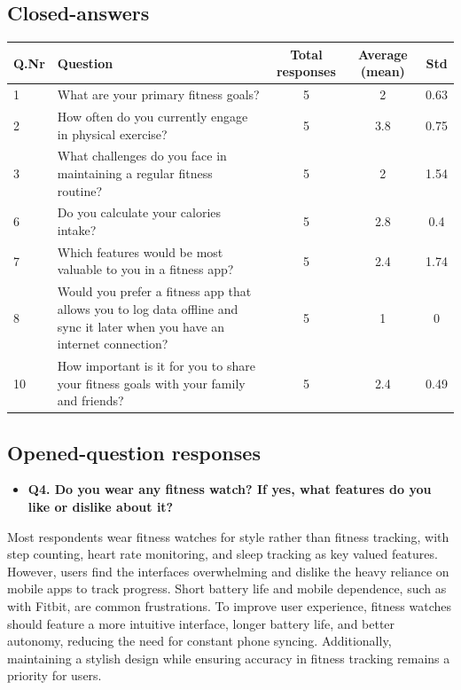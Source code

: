 \documentclass[letterpaper,11pt]{texMemo} %
\begin{document}
\subsection{Closed-answers}
\begin{center}
	\begin{tabular}{| l | p{4cm} | c | c | c |}
		\hline
		\bfseries{Q.Nr} & \bfseries{Question} & \bfseries{Total responses} & \bfseries{Average (mean)} & \bfseries{Std} \\ \hline
		1 & What are your primary fitness goals? & 5 & 2 & 0.63\\ \hline
		2 & How often do you currently engage in physical exercise? & 5 & 3.8 & 0.75 \\ \hline
		3 & What challenges do you face in maintaining a regular fitness routine? & 5 & 2 & 1.54 \\ \hline
		6 & Do you calculate your calories intake? & 5 & 2.8 & 0.4 \\ \hline
		7 & Which features would be most valuable to you in a fitness app? & 5 & 2.4 & 1.74 \\ \hline
		8 & Would you prefer a fitness app that allows you to log data offline and sync it later when you have an internet connection? & 5 & 1 & 0 \\ \hline
		10 & How important is it for you to share your fitness goals with your family and friends? & 5 & 2.4 & 0.49 \\ \hline
	\end{tabular}
\end{center}
\subsection{Opened-question responses}
\begin{itemize}
\item \bfseries{Q4. Do you wear any fitness watch? If yes, what features do you like or dislike about it?}
\end{itemize}

Most respondents wear fitness watches for style rather than fitness tracking, with step counting, heart rate monitoring, and sleep tracking as key valued features. However, users find the interfaces overwhelming and dislike the heavy reliance on mobile apps to track progress. Short battery life and mobile dependence, such as with Fitbit, are common frustrations. To improve user experience, fitness watches should feature a more intuitive interface, longer battery life, and better autonomy, reducing the need for constant phone syncing. Additionally, maintaining a stylish design while ensuring accuracy in fitness tracking remains a priority for users.
\end{document}
